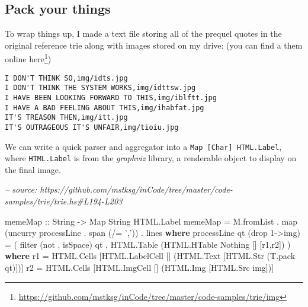 \documentclass[]{article}
\newenvironment{Shaded}{}{}
\newcommand{\CharTok}[1]{\textcolor[rgb]{0.25,0.44,0.63}{#1}}
\newcommand{\CommentTok}[1]{\textcolor[rgb]{0.38,0.63,0.69}{\textit{#1}}}
\newcommand{\DataTypeTok}[1]{\textcolor[rgb]{0.56,0.13,0.00}{#1}}
\newcommand{\DecValTok}[1]{\textcolor[rgb]{0.25,0.63,0.44}{#1}}
\newcommand{\FunctionTok}[1]{\textcolor[rgb]{0.02,0.16,0.49}{#1}}
\newcommand{\KeywordTok}[1]{\textcolor[rgb]{0.00,0.44,0.13}{\textbf{#1}}}
\newcommand{\NormalTok}[1]{#1}
\newcommand{\OtherTok}[1]{\textcolor[rgb]{0.00,0.44,0.13}{#1}}
\renewcommand{\href}[2]{#2\footnote{\url{#1}}}
\begin{document}
\hypertarget{pack-your-things}{%
\subsection{Pack your things}\label{pack-your-things}}

To wrap things up, I made a text file storing all of the prequel quotes in the
original reference trie along with images stored on my drive: (you can find a
them
\href{https://github.com/mstksg/inCode/tree/master/code-samples/trie/img}{online
here})

\begin{verbatim}
I DON'T THINK SO,img/idts.jpg
I DON'T THINK THE SYSTEM WORKS,img/idttsw.jpg
I HAVE BEEN LOOKING FORWARD TO THIS,img/iblftt.jpg
I HAVE A BAD FEELING ABOUT THIS,img/ihabfat.jpg
IT'S TREASON THEN,img/itt.jpg
IT'S OUTRAGEOUS IT'S UNFAIR,img/tioiu.jpg
\end{verbatim}

We can write a quick parser and aggregator into a
\texttt{Map\ {[}Char{]}\ HTML.Label}, where \texttt{HTML.Label} is from the
\emph{graphviz} library, a renderable object to display on the final image.

\begin{Shaded}
\begin{Highlighting}[]
\CommentTok{-- source: https://github.com/mstksg/inCode/tree/master/code-samples/trie/trie.hs#L194-L203}

\OtherTok{memeMap ::} \DataTypeTok{String} \OtherTok{->} \DataTypeTok{Map} \DataTypeTok{String} \DataTypeTok{HTML.Label}
\NormalTok{memeMap }\FunctionTok{=}\NormalTok{ M.fromList }\FunctionTok{.}\NormalTok{ map (uncurry processLine }\FunctionTok{.}\NormalTok{ span (}\FunctionTok{/=} \CharTok{','}\NormalTok{)) }\FunctionTok{.}\NormalTok{ lines}
  \KeywordTok{where}
\NormalTok{    processLine qt (drop }\DecValTok{1}\OtherTok{->}\NormalTok{img) }\FunctionTok{=}\NormalTok{ (}
\NormalTok{          filter (not }\FunctionTok{.}\NormalTok{ isSpace) qt}
\NormalTok{        , }\DataTypeTok{HTML.Table}\NormalTok{ (}\DataTypeTok{HTML.HTable} \DataTypeTok{Nothing}\NormalTok{ [] [r1,r2])}
\NormalTok{        )}
      \KeywordTok{where}
\NormalTok{        r1 }\FunctionTok{=} \DataTypeTok{HTML.Cells}\NormalTok{ [}\DataTypeTok{HTML.LabelCell}\NormalTok{ [] (}\DataTypeTok{HTML.Text}\NormalTok{ [}\DataTypeTok{HTML.Str}\NormalTok{ (T.pack qt)])]}
\NormalTok{        r2 }\FunctionTok{=} \DataTypeTok{HTML.Cells}\NormalTok{ [}\DataTypeTok{HTML.ImgCell}\NormalTok{   [] (}\DataTypeTok{HTML.Img}\NormalTok{ [}\DataTypeTok{HTML.Src}\NormalTok{ img])]}
\end{Highlighting}
\end{Shaded}
\end{document}
